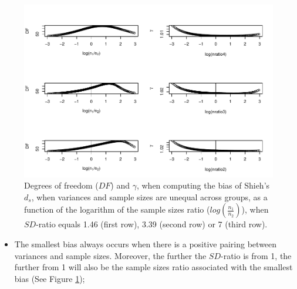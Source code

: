 \documentclass[
  english,
  man,mask]{apa6}
\providecommand{\tightlist}{%
  \setlength{\itemsep}{0pt}\setlength{\parskip}{0pt}}
\begin{document}
\begin{figure}
\centering
\includegraphics{Theoretical-Bias-of-all-estimators-as-a-function-of-population-parameters_files/figure-latex/biasshiehhetunbaldfandvar-1.pdf}
\caption{\label{fig:biasshiehhetunbaldfandvar}Degrees of freedom (\(DF\)) and \(\gamma\), when computing the bias of Shieh's \(d_s\), when variances and sample sizes are unequal across groups, as a function of the logarithm of the sample sizes ratio (\(log \left( \frac{n_1}{n_2} \right)\)), when \(SD\)-ratio equals 1.46 (first row), 3.39 (second row) or 7 (third row).}
\end{figure}

\begin{itemize}
\tightlist
\item
  The smallest bias always occurs when there is a positive pairing between variances and sample sizes. Moreover, the further the \(SD\)-ratio is from 1, the further from 1 will also be the sample sizes ratio associated with the smallest bias (See Figure \ref{fig:biasshiehhetunbaldfandvar});
\end{itemize}
\end{document}
